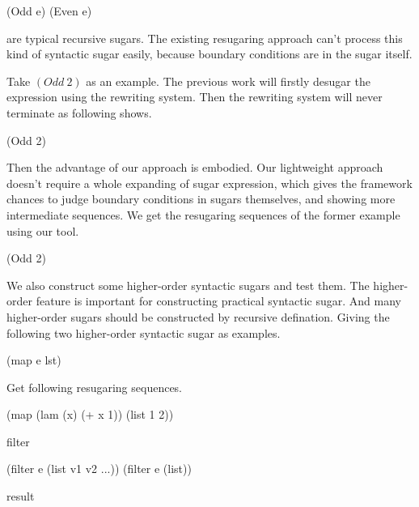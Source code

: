 \begin{Codes}
(Odd e) 
(Even e) 
\end{Codes}
are typical recursive sugars. The existing resugaring approach can't process this kind of syntactic sugar easily, because boundary conditions are in the sugar itself.

Take $(Odd~2)$ as an example. The previous work will firstly desugar the expression using the rewriting system. Then the rewriting system will never terminate as following shows.
\begin{Codes}
   (Odd 2)
\end{Codes}


Then the advantage of our approach is embodied. Our lightweight approach doesn't require a whole expanding of sugar expression, which gives the framework chances to judge boundary conditions in sugars themselves, and showing more intermediate sequences. We get the resugaring sequences of the former example using our tool.
\begin{Codes}
    (Odd 2)
\end{Codes}


We also construct some higher-order syntactic sugars and test them. The higher-order feature is important for constructing practical syntactic sugar. And many higher-order sugars should be constructed by recursive defination. Giving the following two higher-order syntactic sugar as examples.
\begin{Codes}
    (map e lst)
\end{Codes}
Get following resugaring sequences.
\begin{Codes}
    (map (lam (x) (+ x 1)) (list 1 2))
\end{Codes}
filter
\begin{Codes}
   (filter e (list v1 v2 ...))
   (filter e (list)) 
\end{Codes}
result

